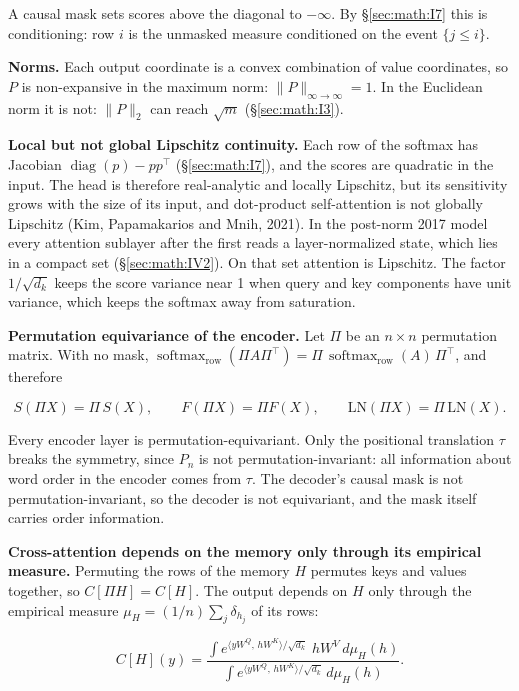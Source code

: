 A causal mask sets scores above the diagonal to \(-\infty\). By \S\ref{sec:math:I7} this is
conditioning: row \(i\) is the unmasked measure conditioned on the event
\(\{j \le i\}\).

\textbf{Norms.} Each output coordinate is a convex combination of value
coordinates, so \(P\) is non-expansive in the maximum norm: \(\|P\|_{\infty\to\infty} = 1\).
In the Euclidean norm it is not: \(\|P\|_{2}\) can reach \(\sqrt{m}\) (\S\ref{sec:math:I3}).

\textbf{Local but not global Lipschitz continuity.} Each row of the
softmax has Jacobian \(\operatorname{diag}(p) - pp^{\top}\) (\S\ref{sec:math:I7}), and the scores are
quadratic in the input. The head is therefore real-analytic and locally
Lipschitz, but its sensitivity grows with the size of its input, and
dot-product self-attention is not globally Lipschitz (Kim, Papamakarios
and Mnih, 2021). In the post-norm
2017 model every attention sublayer after the first reads a
layer-normalized state, which lies in a compact set (\S\ref{sec:math:IV2}). On that set
attention is Lipschitz. The factor \(1/\sqrt{d_k}\) keeps the score variance near
1 when query and key components have unit variance, which keeps the
softmax away from saturation.

\textbf{Permutation equivariance of the encoder.} Let \(\Pi\) be an \(n \times n\)
permutation matrix. With no mask, \(\operatorname{softmax}_{\mathrm{row}}(\Pi A\Pi^{\top}) = \Pi\,
\operatorname{softmax}_{\mathrm{row}}(A)\, \Pi^{\top}\), and therefore

\[
S(\Pi X) = \Pi\, S(X), \qquad F(\Pi X) = \Pi F(X), \qquad \mathrm{LN}(\Pi X) = \Pi\,\mathrm{LN}(X).
\]

Every encoder layer is permutation-equivariant. Only the positional
translation \(\tau\) breaks the symmetry, since \(P_n\) is not
permutation-invariant: all information about word order in the encoder
comes from \(\tau\). The decoder's causal mask is not permutation-invariant, so
the decoder is not equivariant, and the mask itself carries order
information.

\textbf{Cross-attention depends on the memory only through its empirical
measure.} Permuting the rows of the memory \(H\) permutes keys and values
together, so \(C[\Pi H] = C[H]\). The output depends on \(H\) only through
the empirical measure \(\mu_H = (1/n) \sum_j \delta_{h_j}\) of its rows:

\[
C[H](y) = \frac{\int e^{\langle yW^Q,\, hW^K\rangle/\sqrt{d_k}}\; hW^V\, d\mu_H(h)}{\int e^{\langle yW^Q,\, hW^K\rangle/\sqrt{d_k}}\, d\mu_H(h)} .
\]

